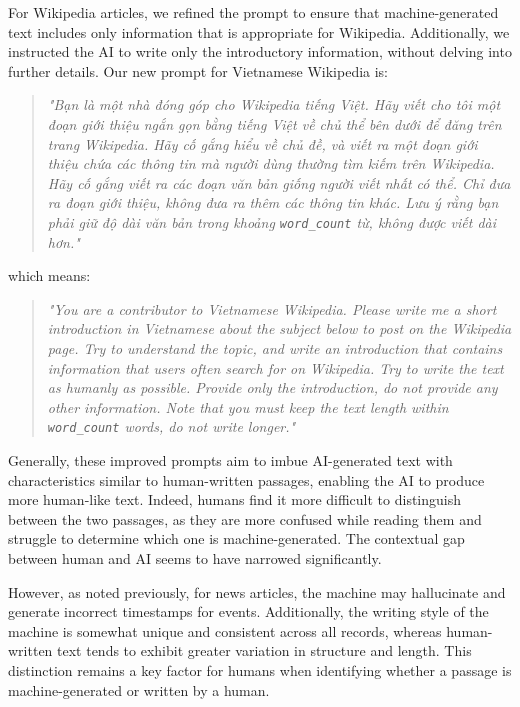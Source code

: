 For Wikipedia articles, we refined the prompt to ensure that machine-generated text includes only information that is appropriate for Wikipedia. Additionally, we instructed the AI to write only the introductory information, without delving into further details.
Our new prompt for Vietnamese Wikipedia is:
\begin{quote}
    \textit{"Bạn là một nhà đóng góp cho Wikipedia tiếng Việt. Hãy viết cho tôi một đoạn giới thiệu ngắn gọn bằng tiếng Việt về chủ thể bên dưới để đăng trên trang Wikipedia. Hãy cố gắng hiểu về chủ đề, và viết ra một đoạn giới thiệu chứa các thông tin mà người dùng thường tìm kiếm trên Wikipedia. Hãy cố gắng viết ra các đoạn văn bản giống người viết nhất có thể. Chỉ đưa ra đoạn giới thiệu, không đưa ra thêm các thông tin khác. Lưu ý rằng bạn phải giữ độ dài văn bản trong khoảng \texttt{word\_count} từ, không được viết dài hơn."}
\end{quote}
which means:
\begin{quote}
    \textit{"You are a contributor to Vietnamese Wikipedia. Please write me a short introduction in Vietnamese about the subject below to post on the Wikipedia page. Try to understand the topic, and write an introduction that contains information that users often search for on Wikipedia. Try to write the text as humanly as possible. Provide only the introduction, do not provide any other information. Note that you must keep the text length within \texttt{word\_count} words, do not write longer."}
\end{quote}

Generally, these improved prompts aim to imbue AI-generated text with characteristics similar to human-written passages, enabling the AI to produce more human-like text. Indeed, humans find it more difficult to distinguish between the two passages, as they are more confused while reading them and struggle to determine which one is machine-generated. The contextual gap between human and AI seems to have narrowed significantly.

However, as noted previously, for news articles, the machine may hallucinate and generate incorrect timestamps for events. Additionally, the writing style of the machine is somewhat unique and consistent across all records, whereas human-written text tends to exhibit greater variation in structure and length. This distinction remains a key factor for humans when identifying whether a passage is machine-generated or written by a human.


